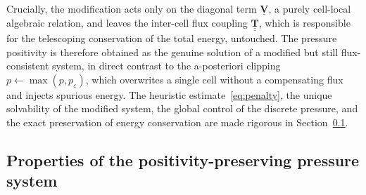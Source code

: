 \documentclass[a4paper,fleqn]{cas-sc}
\theoremstyle{definition}
\theoremstyle{remark}
\begin{document}
Crucially, the modification acts only on the diagonal term $\underline{\mathbf{V}}$, a
purely cell-local algebraic relation, and leaves the inter-cell flux coupling
$\underline{\underline{\mathbf{T}}}$, which is responsible for the telescoping conservation of
the total energy, untouched. The pressure positivity is therefore obtained as the genuine
solution of a modified but still flux-consistent system, in direct contrast to the
a-posteriori clipping $p\leftarrow\max(p,p_{\varepsilon})$, which overwrites a single
cell without a compensating flux and injects spurious energy. The heuristic
estimate~\eqref{eq:penalty}, the unique solvability of the modified system, the global
control of the discrete pressure, and the exact preservation of energy conservation are
made rigorous in Section~\ref{sec:properties}.



\subsection{Properties of the positivity-preserving pressure system}
\label{sec:properties}
\end{document}
